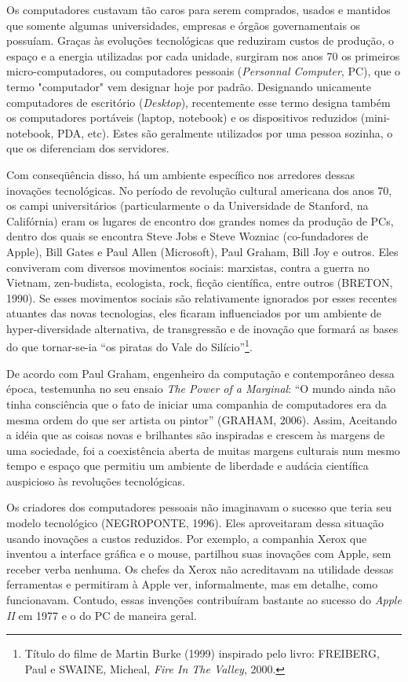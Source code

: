 Os computadores custavam tão caros para serem comprados, usados e mantidos que somente algumas universidades, empresas e órgãos governamentais os possuíam. Graças às evoluções tecnológicas que reduziram custos de produção, o espaço e a energia utilizadas por cada unidade, surgiram nos anos 70 os primeiros micro-computadores, ou computadores pessoais (\emph{Personnal Computer}, PC), que o termo "computador" vem designar hoje por padrão. Designando unicamente computadores de escritório (\emph{Desktop}), recentemente esse termo designa também os computadores portáveis (laptop, notebook) e os dispositivos reduzidos (mini-notebook, PDA, etc). Estes são geralmente utilizados por uma pessoa sozinha, o que os diferenciam dos servidores.

Com conseqüência disso, há um ambiente específico nos arredores dessas inovações tecnológicas. No período de revolução cultural americana dos anos 70, os campi universitários (particularmente o da Universidade de Stanford, na Califórnia) eram os lugares de encontro dos grandes nomes da produção de PCs, dentro dos quais se encontra Steve Jobs e Steve Wozniac (co-fundadores de Apple), Bill Gates e Paul Allen (Microsoft), Paul Graham, Bill Joy e outros. Eles conviveram com diversos movimentos sociais: marxistas, contra a guerra no Vietnam, zen-budista, ecologista, rock, ficção científica, entre outros (BRETON, 1990). Se esses movimentos sociais são relativamente ignorados por esses recentes atuantes das novas tecnologias, eles ficaram influenciados por um ambiente de hyper-diversidade alternativa, de transgressão e de inovação que formará as bases do que tornar-se-ia “os piratas do Vale do Silício”\footnote{Título do filme de Martin Burke (1999) inspirado pelo livro: FREIBERG, Paul e SWAINE, Micheal, \emph{Fire In The Valley}, 2000.}.

De acordo com Paul Graham, engenheiro da computação e contemporâneo dessa época, testemunha no seu ensaio \emph{The Power of a Marginal}: “O mundo ainda não tinha consciência que o fato de iniciar uma companhia de computadores era da mesma ordem do que ser artista ou pintor” (GRAHAM, 2006). Assim, Aceitando a idéia que as coisas novas e brilhantes são inspiradas e crescem às margens de uma sociedade, foi a coexistência aberta de muitas margens culturais num mesmo tempo e espaço que permitiu um ambiente de liberdade e audácia científica auspicioso às revoluções tecnológicas.

Os criadores dos computadores pessoais não imaginavam o sucesso que teria seu modelo tecnológico (NEGROPONTE, 1996). Eles aproveitaram dessa situação usando inovações a custos reduzidos. Por exemplo, a companhia Xerox que inventou a interface gráfica e o mouse, partilhou suas inovações com Apple, sem receber verba nenhuma. Os chefes da Xerox não acreditavam na utilidade dessas ferramentas e permitiram à Apple ver, informalmente, mas em detalhe, como funcionavam. Contudo, essas invenções contribuíram bastante ao sucesso do \emph{Apple II} em 1977 e o do PC de maneira geral.


